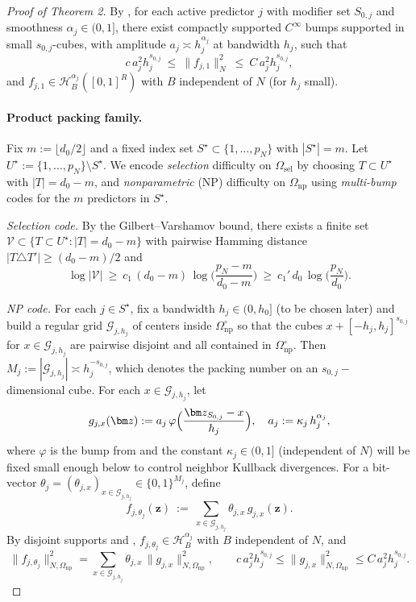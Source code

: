 \documentclass[11pt]{article}
\theoremstyle{plain}
\theoremstyle{definition}
\theoremstyle{plain}
\begin{document}
\begin{proof}[Proof of Theorem 2]
By , for each active predictor $j$ with modifier set $S_{0,j}$ and smoothness $\alpha_j\in(0,1]$, there exist compactly supported $C^\infty$ bumps supported in small $s_{0,j}$-cubes, with amplitude $a_{j}\asymp h_j^{\alpha_j}$ at bandwidth $h_j$, such that
\begin{equation}\label{eq:bump-energy}
c\,a_{j}^2 h_j^{s_{0,j}}\ \le\ \|f_{j,1}\|_N^2\ \le\ C\,a_{j}^2 h_j^{s_{0,j}},
\end{equation}
and $f_{j,1}\in\mathcal H^{\alpha_j}_B([0,1]^R)$ with $B$ independent of $N$ (for $h_j$ small).

\paragraph{Product packing family.}
Fix $m:=\lfloor d_0/2\rfloor$ and a fixed index set $S^\star\subset\{1,\dots,p_N\}$ with $|S^\star|=m$.
Let $U^\star:=\{1,\dots,p_N\}\setminus S^\star$.
We encode \emph{selection} difficulty on $\Omega_{\mathrm{sel}}$ by choosing $T\subset U^\star$ with $|T|=d_0-m$,
and \emph{nonparametric} (NP) difficulty on $\Omega_{\mathrm{np}}$ using \emph{multi-bump} codes for the $m$ predictors in $S^\star$.

\smallskip
\emph{Selection code.}
By the Gilbert--Varshamov bound, there exists a finite set
$\mathcal V\subset\{T\subset U^\star: |T|=d_0-m\}$ with pairwise Hamming distance
$|T\triangle T'|\ge (d_0-m)/2$ and
\begin{equation}\label{eq:GV-size}
\log|\mathcal V|\ \ge\ c_1\,(d_0-m)\,\log\!\Big(\frac{p_N-m}{d_0-m}\Big)
\ \ge\ c_1'\,d_0\,\log\!\Big(\frac{p_N}{d_0}\Big).
\end{equation}

\smallskip
\emph{NP code.}
For each $j\in S^\star$, fix a bandwidth $h_j\in(0,h_0]$ (to be chosen later) and build a regular grid
$\mathcal G_{j,h_j}$ of centers inside $\Omega_{\mathrm{np}}^\circ$ so that the cubes
$x+[ -h_j, h_j]^{s_{0,j}}$ for $x\in\mathcal G_{j,h_j}$ are pairwise disjoint and all contained in $\Omega_{\mathrm{np}}^\circ$.
Then $M_j:=|\mathcal G_{j,h_j}|\asymp h_j^{-s_{0,j}}$, which denotes the packing number on an $s_{0,j}-$ dimensional cube.
For each $x\in\mathcal G_{j,h_j}$, let
\[
g_{j,x}(\bm z):= a_j\,\varphi \Bigl(\frac{\bm z_{S_{0,j}}-x}{h_j}\Bigr),
\quad a_j:=\kappa_j\,h_j^{\alpha_j},
\]
where $\varphi$ is the bump from  and the constant $\kappa_j\in(0,1]$ (independent of $N$) will be fixed small enough below to control neighbor Kullback divergences. For a bit-vector $\theta_j=(\theta_{j,x})_{x\in\mathcal G_{j,h_j}}\in\{0,1\}^{M_j}$, define
\[
f_{j,\theta_j}(\bm z) \ :=\ \sum_{x\in\mathcal G_{j,h_j}} \theta_{j,x}\,g_{j,x}(\bm z).
\]
By disjoint supports and , $f_{j,\theta_j}\in \mathcal H^{\alpha_j}_B$ with $B$ independent of $N$, and
\begin{equation}\label{eq:additivity-energy}
\|f_{j,\theta_j}\|_{N,\Omega_{\mathrm{np}}}^2
= \sum_{x\in\mathcal G_{j,h_j}} \theta_{j,x}\,\|g_{j,x}\|_{N,\Omega_{\mathrm{np}}}^2,
\qquad
c\,a_j^2 h_j^{s_{0,j}}\le \|g_{j,x}\|_{N,\Omega_{\mathrm{np}}}^2 \le C\,a_j^2 h_j^{s_{0,j}}.
\end{equation}


\end{proof}
\end{document}
